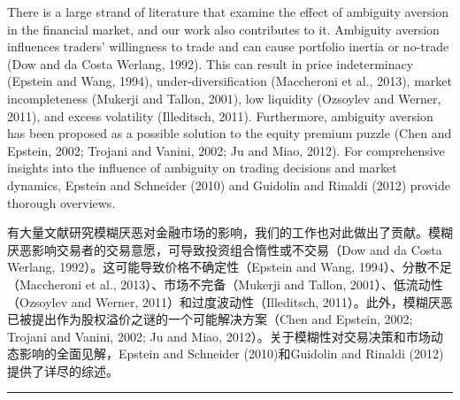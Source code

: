 \documentclass[12pt,a4paper]{article}
\newenvironment{original}{%
  \par\vspace{4pt}\noindent%
  \color{black}%
  \ignorespaces
}{%
  \par\vspace{2pt}%
}
\newenvironment{translation}{%
  \par\vspace{2pt}\noindent%
  \color{transblue}%
  \ignorespaces
}{%
  \par\vspace{4pt}\hrule\vspace{6pt}%
}
\begin{document}
\begin{original}
There is a large strand of literature that examine the effect of ambiguity aversion in the financial market, and our work also contributes to it. Ambiguity aversion influences traders' willingness to trade and can cause portfolio inertia or no-trade (Dow and da Costa Werlang, 1992). This can result in price indeterminacy (Epstein and Wang, 1994), under-diversification (Maccheroni et al., 2013), market incompleteness (Mukerji and Tallon, 2001), low liquidity (Ozsoylev and Werner, 2011), and excess volatility (Illeditsch, 2011). Furthermore, ambiguity aversion has been proposed as a possible solution to the equity premium puzzle (Chen and Epstein, 2002; Trojani and Vanini, 2002; Ju and Miao, 2012). For comprehensive insights into the influence of ambiguity on trading decisions and market dynamics, Epstein and Schneider (2010) and Guidolin and Rinaldi (2012) provide thorough overviews.
\end{original}
\begin{translation}
有大量文献研究模糊厌恶对金融市场的影响，我们的工作也对此做出了贡献。模糊厌恶影响交易者的交易意愿，可导致投资组合惰性或不交易（Dow and da Costa Werlang, 1992）。这可能导致价格不确定性（Epstein and Wang, 1994）、分散不足（Maccheroni et al., 2013）、市场不完备（Mukerji and Tallon, 2001）、低流动性（Ozsoylev and Werner, 2011）和过度波动性（Illeditsch, 2011）。此外，模糊厌恶已被提出作为股权溢价之谜的一个可能解决方案（Chen and Epstein, 2002; Trojani and Vanini, 2002; Ju and Miao, 2012）。关于模糊性对交易决策和市场动态影响的全面见解，Epstein and Schneider (2010)和Guidolin and Rinaldi (2012)提供了详尽的综述。
\end{translation}
\end{document}
